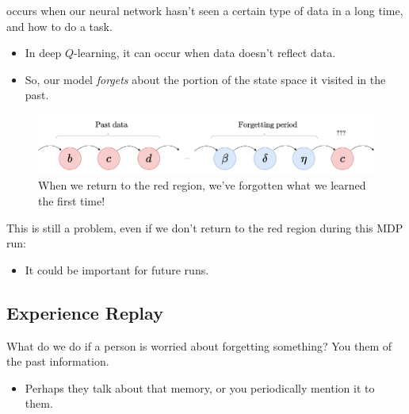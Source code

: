         \begin{definition}
             occurs when our neural network hasn't seen a certain type of data in a long time, and  how to do a task.

            \begin{itemize}
                \item In deep $Q$-learning, it can occur when  data doesn't reflect  data.

                \item So, our model \textit{forgets} about the portion of the state space it visited in the past.
            \end{itemize}
        \end{definition}

        \begin{figure}[H]
            \centering
            \includegraphics[width=130mm,scale=0.5]{images/rl_images/catastrophic forgetting.png}
            \caption*{When we return to the red region, we've forgotten what we learned the first time!}
        \end{figure}

        This is still a problem, even if we don't return to the red region during this MDP run:

        \begin{itemize}
            \item It could be important for future runs.
        \end{itemize}




    \phantom{}

    \subsection{Experience Replay}

        What do we do if a person is worried about forgetting something? You  them of the past information.

        \begin{itemize}
            \item Perhaps they talk about that memory, or you periodically mention it to them.
        \end{itemize}

